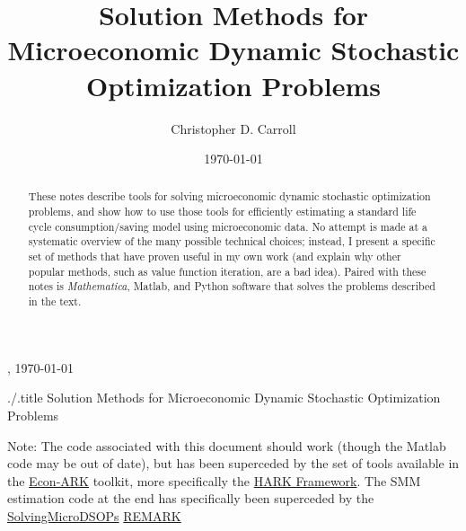 \documentclass[titlepage, headings=optiontotocandhead]{\econtex}
\begin{document}
\renewcommand{\onlyinsubfile}[1]{}\renewcommand{\notinsubfile}[1]{#1}

\hfill{\tiny \jobname, \today}

\begin{verbatimwrite}{./\texname.title}
  Solution Methods for Microeconomic Dynamic Stochastic Optimization Problems
\end{verbatimwrite}

\title{Solution Methods for Microeconomic Dynamic Stochastic Optimization Problems}

\author{Christopher D. Carroll\authNum}


\date{\today}
\maketitle

\noindent  Note: The code associated with this document should work (though the Matlab code may be out of date), but has been superceded by the set of tools available in the \href{https://github.com/econ-ark/HARK}{Econ-ARK} toolkit, more specifically the \href{https://github.com/econ-ark/HARK}{HARK Framework}.  The SMM estimation code at the end has specifically been superceded by the \href{https://econ-ark.org/materials/solvingmicrodsops?launch}{SolvingMicroDSOPs} \href{https://github.com/econ-ark/REMARK}{REMARK}


\hypertarget{Abstract}{}
\begin{abstract}
  These notes describe tools for solving microeconomic dynamic stochastic optimization problems, and show how to use those tools for efficiently estimating a standard life cycle consumption/saving model using microeconomic data.  No attempt is made at a systematic overview of the many possible technical choices; instead, I present a specific set of methods that have proven useful in my own work (and explain why other popular methods, such as value function iteration, are a bad idea).  Paired with these notes is \textit{Mathematica}, Matlab, and Python software that solves the problems described in the text.
\end{abstract}
\end{document}
